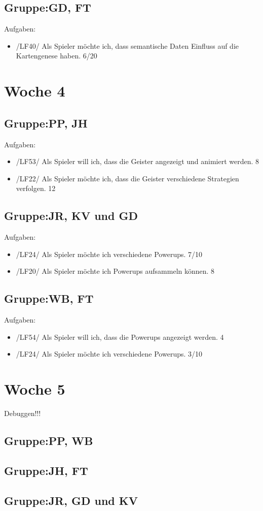\documentclass[11pt,a4paper]{article}
\begin{document}
\subsection*{Gruppe:GD, FT}
Aufgaben:
\begin{itemize}
\item /LF40/ Als Spieler möchte ich, dass semantische Daten Einfluss auf die
Kartengenese haben. 6/20 
\end{itemize}



\section*{Woche 4}

\subsection*{Gruppe:PP, JH}
Aufgaben:
\begin{itemize}
\item /LF53/ Als Spieler will ich, dass die Geister angezeigt und animiert werden. 8
\item /LF22/ Als Spieler möchte ich, dass die Geister verschiedene Strategien verfolgen. 12
\end{itemize}
\subsection*{Gruppe:JR, KV und GD}
Aufgaben:
\begin{itemize}
\item /LF24/ Als Spieler möchte ich verschiedene Powerups. 7/10
\item /LF20/ Als Spieler möchte ich Powerups aufsammeln können. 8
\end{itemize}

\subsection*{Gruppe:WB, FT}
Aufgaben:
\begin{itemize}
\item /LF54/ Als Spieler will ich, dass die Powerups angezeigt werden. 4
\item /LF24/ Als Spieler möchte ich verschiedene Powerups. 3/10
\end{itemize}

\section*{Woche 5}
Debuggen!!!

\subsection*{Gruppe:PP, WB}

\subsection*{Gruppe:JH, FT}

\subsection*{Gruppe:JR, GD und KV}
\end{document}
